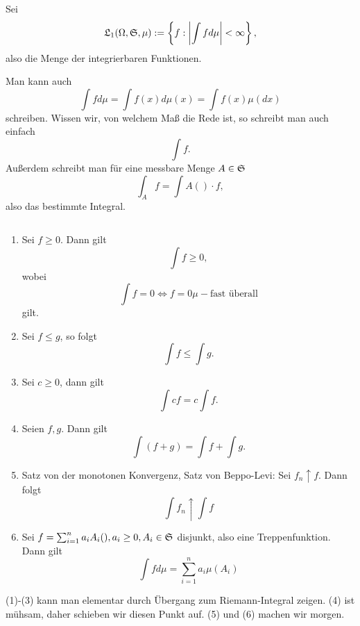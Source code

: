 			\begin{defi}
				Sei 
				\[ \mathfrak{L}_1(\Omega,\mathfrak{S}, \mu):=\left\{f: \left|\int fd\mu\right|<\infty\right\}, \]
				also die Menge der integrierbaren Funktionen. 
			\end{defi}
			
			\begin{bem}[Notation]
				Man kann auch 
				\[ \int fd\mu=\int f(x) d\mu(x)=\int f(x)\mu(dx) \]
				schreiben. Wissen wir, von welchem Maß die Rede ist, so schreibt man auch einfach
				\[ \int f. \]
				Außerdem schreibt man für eine messbare Menge $A\in\mathfrak{S}$
				\[ \int_A f=\int A()\cdot f, \]
				also das bestimmte Integral. 
			\end{bem}
			
			\begin{satz}
				$  $
				\begin{enumerate}[(1)]
					\item Sei $f\ge 0$. Dann gilt
					\[ \int f\ge 0, \]
					wobei
					\[ \int f=0\Leftrightarrow f=0 \mu-\text{fast überall} \]
					gilt. 
					\item Sei $f\le g$, so folgt
					\[ \int f\le \int g. \]
					\item Sei $c\ge 0$, dann gilt
					\[ \int cf=c\int f. \]
					\item Seien $f,g$. Dann gilt
					\[ \int (f+g)=\int f+\int g. \] 
					\item Satz von der monotonen Konvergenz, Satz von Beppo-Levi:\newline
					 Sei $f_n\uparrow f$. Dann folgt
					\[ \int f_n\uparrow \int f \]
					\item Sei $f=\sum_{i=1}^n a_i A_i(),a_i\ge 0, A_i\in\mathfrak{S}$ disjunkt, also eine Treppenfunktion. Dann gilt
					\[ \int fd\mu=\sum_{i=1}^n a_i\mu(A_i) \]
				\end{enumerate}
			\end{satz}
			
			\begin{bew}
				(1)-(3) kann man elementar durch Übergang zum Riemann-Integral zeigen. (4) ist mühsam, daher schieben wir diesen Punkt auf. (5) und (6) machen wir morgen. 
			\end{bew}
				
				